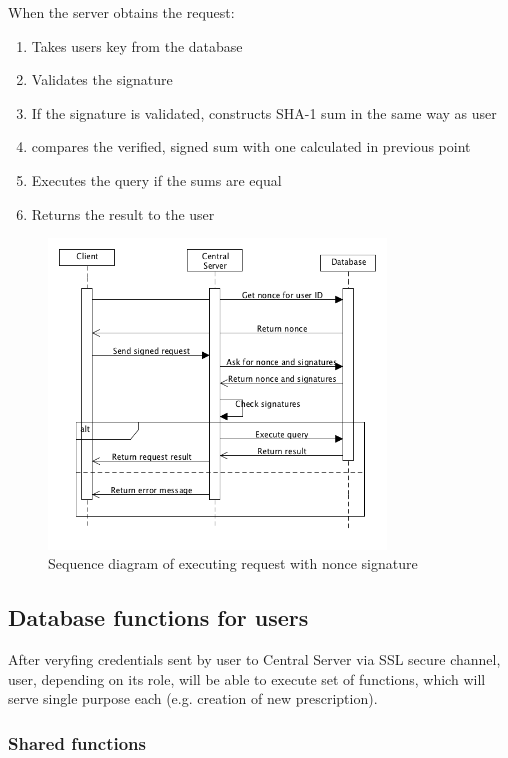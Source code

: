 When the server obtains the request:

\begin{enumerate}
\item Takes users key from the database
\item Validates the signature
\item If the signature is validated, constructs SHA-1 sum in the same way as user
\item compares the verified, signed sum with one calculated in previous point
\item Executes the query if the sums are equal
\item Returns the result to the user
\end{enumerate} 

\clearpage
\begin{figure}[h]
\centering
\includegraphics[width=0.8\textwidth]{database/nonce.png}
\caption{Sequence diagram of executing request with nonce signature}
\end{figure} 

\subsection{Database functions for users}
After veryfing credentials sent by user to Central Server via SSL secure channel, user, depending on its role, will be able to execute set of functions, which will serve single purpose each (e.g. creation of new prescription).

\subsubsection{Shared functions}

